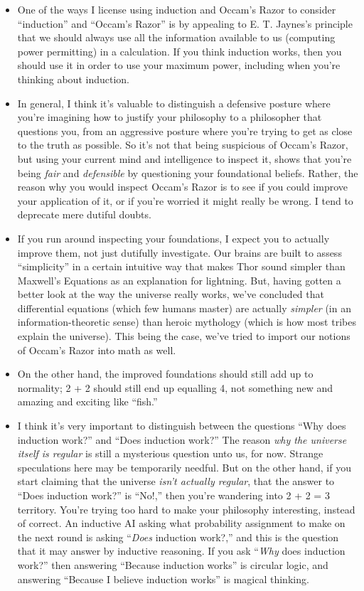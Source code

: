 \begin{itemize}
\item {
 One of the ways I license using induction and
Occam's Razor to consider
``induction'' and
``Occam's Razor'' is
by appealing to E. T. Jaynes's principle that we should
always use all the information available to us (computing power
permitting) in a calculation. If you think induction works, then you
should use it in order to use your maximum power, including when
you're thinking about induction.}

\item {
 In general, I think it's valuable to distinguish a
defensive posture where you're imagining how to justify
your philosophy to a philosopher that questions you, from an aggressive
posture where you're trying to get as close to the
truth as possible. So it's not that being suspicious of
Occam's Razor, but using your current mind and
intelligence to inspect it, shows that you're being
\textit{fair} and \textit{defensible} by questioning your foundational
beliefs. Rather, the reason why you would inspect
Occam's Razor is to see if you could improve your
application of it, or if you're worried it might really
be wrong. I tend to deprecate mere dutiful doubts.}

\item {
 If you run around inspecting your foundations, I expect you to
actually improve them, not just dutifully investigate. Our brains are
built to assess ``simplicity'' in a
certain intuitive way that makes Thor sound simpler than
Maxwell's Equations as an explanation for lightning.
But, having gotten a better look at the way the universe really works,
we've concluded that differential equations (which few
humans master) are actually \textit{simpler} (in an
information-theoretic sense) than heroic mythology (which is how most
tribes explain the universe). This being the case,
we've tried to import our notions of
Occam's Razor into math as well.}

\item {
 On the other hand, the improved foundations should still add up to
normality; 2 + 2 should still end up equalling 4, not something new and
amazing and exciting like ``fish.''}

\item {
 I think it's very important to distinguish between
the questions ``Why does induction
work?'' and ``Does induction
work?'' The reason \textit{why the universe itself is
regular} is still a mysterious question unto us, for now. Strange
speculations here may be temporarily needful. But on the other hand, if
you start claiming that the universe \textit{isn't
actually regular}, that the answer to ``Does induction
work?'' is
``No!,'' then you're
wandering into 2 + 2 = 3 territory. You're trying too
hard to make your philosophy interesting, instead of correct. An
inductive AI asking what probability assignment to make on the next
round is asking ``\textit{Does} induction
work?,'' and this is the question that it may answer
by inductive reasoning. If you ask ``\textit{Why} does
induction work?'' then answering
``Because induction works'' is
circular logic, and answering ``Because I believe
induction works'' is magical thinking.}


\end{itemize}
